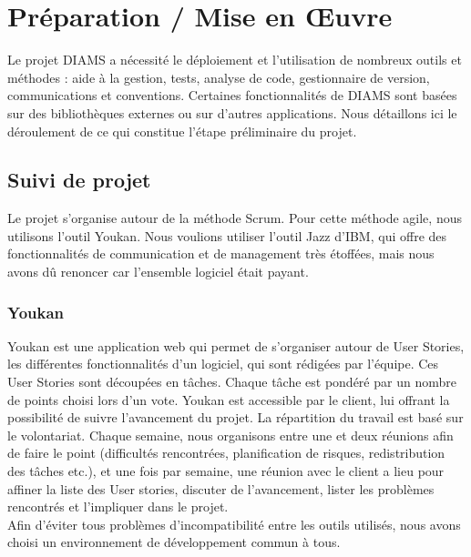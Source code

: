 \chapter{Préparation / Mise en Œuvre} %
Le projet DIAMS a nécessité le déploiement et l'utilisation de nombreux outils et méthodes : aide à 
la gestion,
tests, analyse de code, gestionnaire de version, communications et conventions. Certaines 
fonctionnalités de DIAMS sont basées sur des bibliothèques externes ou sur d'autres applications. 
Nous détaillons ici le déroulement de ce qui constitue l'étape préliminaire du projet.

\section{Suivi de projet}
Le projet s'organise autour de la méthode Scrum. Pour cette méthode agile, nous utilisons l'outil
Youkan. Nous voulions utiliser l'outil Jazz d'IBM, qui offre des fonctionnalités 
de communication et de management très étoffées, mais nous avons dû renoncer car l'ensemble logiciel était payant.

\subsection{Youkan} %
Youkan est une application web qui permet de s'organiser autour de User Stories,
les différentes fonctionnalités d'un logiciel, qui sont rédigées par l'équipe.
Ces User Stories sont découpées en tâches. Chaque tâche est pondéré par un nombre de points choisi
lors d'un vote. Youkan est accessible par le client, lui offrant la possibilité de suivre l'avancement du
projet. La répartition du travail est basé sur le volontariat. Chaque semaine, nous organisons entre une et deux
réunions afin de faire le point (difficultés rencontrées, planification de risques, redistribution des tâches etc.),
et une fois par semaine, une réunion avec le client a lieu pour affiner la liste des User stories, discuter de
l'avancement, lister les problèmes rencontrés et l'impliquer dans le projet.\\
Afin d'éviter tous problèmes d'incompatibilité entre les outils utilisés, nous avons choisi un environnement de développement commun à tous.

